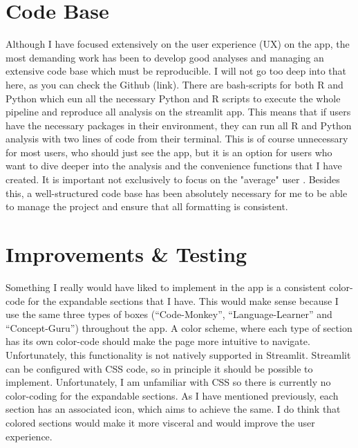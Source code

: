 \documentclass[12pt]{article}
\begin{document}
\section{Code Base}
Although I have focused extensively on the user experience (UX) on the app,
the most demanding work has been to develop good analyses and managing an extensive
code base which must be reproducible. I will not go too deep into that here,
as you can check the Github (link). There are bash-scripts for both R and Python
which eun all the necessary Python and R scripts to execute the whole pipeline
and reproduce all analysis on the streamlit app. This means that if users have
the necessary packages in their environment, they can run all R and Python analysis
with two lines of code from their terminal. This is of course unnecessary for most users,
who should just see the app, but it is an option for users who want to dive deeper
into the analysis and the convenience functions that I have created. It is
important not exclusively to focus on the "average" user
\autocite[14]{mills1992macintosh}.
Besides this, a well-structured code base has been absolutely necessary for me to
be able to manage the project and ensure that all formatting is consistent.

\section{Improvements \& Testing}
Something I really would have liked to implement in the app is a consistent
color-code for the expandable sections that I have. This would make sense
because I use the same three types of boxes (“Code-Monkey”, “Language-Learner” and “Concept-Guru”)
throughout the app. A color scheme, where each type of section has its own color-code
should make the page more intuitive to navigate. Unfortunately, this functionality
is not natively supported in Streamlit. Streamlit can be configured with CSS code,
so in principle it should be possible to implement. Unfortunately, I am unfamiliar
with CSS so there is currently no color-coding for the expandable sections.
As I have mentioned previously, each section has an associated icon,
which aims to achieve the same. I do think that colored sections would make
it more visceral and would improve the user experience.

\vspace{5mm}
\end{document}
